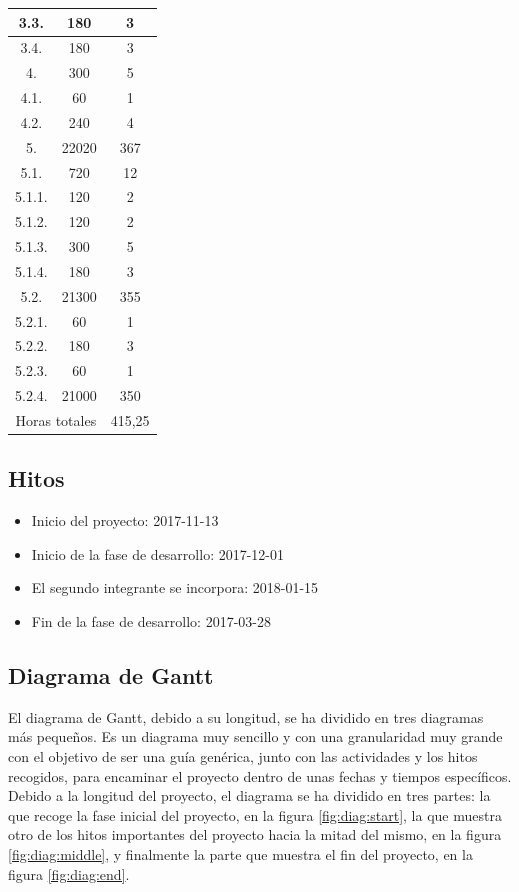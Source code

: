 \begin{longtable}{c|c|c}
3.3. & 180 & 3 \\ \hline
3.4. & 180 & 3 \\ \hline
4. & 300 & 5 \\ \hline
4.1. & 60 & 1 \\ \hline
4.2. & 240 & 4 \\ \hline
5. & 22020 & 367 \\ \hline
5.1. & 720 & 12 \\ \hline
5.1.1. & 120 & 2 \\ \hline
5.1.2. & 120 & 2 \\ \hline
5.1.3. & 300 & 5 \\ \hline
5.1.4. & 180 & 3 \\ \hline
5.2. & 21300 & 355 \\ \hline
5.2.1. & 60 & 1 \\ \hline
5.2.2. & 180 & 3 \\ \hline
5.2.3. & 60 & 1 \\ \hline
5.2.4. & 21000 & 350 \\ \hline
\multicolumn{2}{c|}{Horas totales} & 415,25 \\
\end{longtable}

\subsection{Hitos}
\begin{itemize}
  \item Inicio del proyecto: 2017-11-13
  \item Inicio de la fase de desarrollo: 2017-12-01
  \item El segundo integrante se incorpora: 2018-01-15
  \item Fin de la fase de desarrollo: 2017-03-28
\end{itemize}

\subsection{Diagrama de Gantt}
El diagrama de Gantt, debido a su longitud, se ha dividido en tres diagramas
más pequeños. Es un diagrama muy sencillo y con una granularidad muy grande
con el objetivo de ser una guía genérica, junto con las actividades y los hitos
recogidos, para encaminar el proyecto dentro de unas fechas y tiempos
específicos. Debido a la longitud del proyecto, el diagrama se ha dividido
en tres partes: la que recoge la fase inicial del proyecto, en la figura
\ref{fig:diag:start}, la que muestra otro de los hitos importantes del proyecto
hacia la mitad del mismo, en la figura \ref{fig:diag:middle}, y finalmente la
parte que muestra el fin del proyecto, en la figura \ref{fig:diag:end}.

